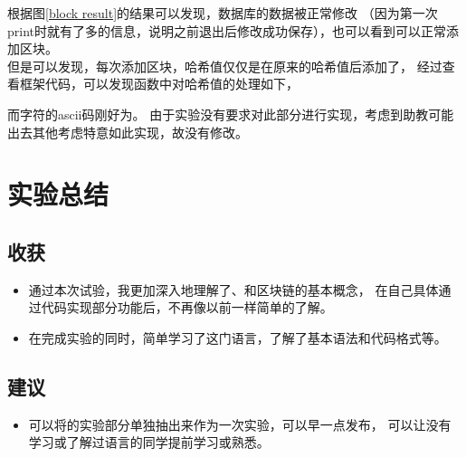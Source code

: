 \documentclass{article}
\begin{document}
根据图\ref{block result}的结果可以发现，数据库的数据被正常修改
（因为第一次print时就有了多的信息，说明之前退出后修改成功保存），也可以看到可以正常添加区块。\\
但是可以发现，每次添加区块，哈希值仅仅是在原来的哈希值后添加了，
经过查看框架代码，可以发现函数中对哈希值的处理如下，
\begin{center}
\end{center}
而字符的ascii码刚好为。
由于实验没有要求对此部分进行实现，考虑到助教可能出去其他考虑特意如此实现，故没有修改。

\section{实验总结}

\subsection{收获}

\begin{itemize}
    \item 通过本次试验，我更加深入地理解了、和区块链的基本概念，
    在自己具体通过代码实现部分功能后，不再像以前一样简单的了解。
    \item 在完成实验的同时，简单学习了这门语言，了解了基本语法和代码格式等。
\end{itemize}

\subsection{建议}
\begin{itemize}
    \item 可以将的实验部分单独抽出来作为一次实验，可以早一点发布，
    可以让没有学习或了解过语言的同学提前学习或熟悉。
\end{itemize}
\end{document}
